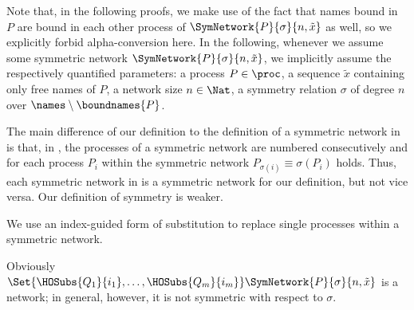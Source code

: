 \documentclass[11pt,techReport]{eptcs}
\begin{document}
\noindent
Note that, in the following proofs, we make use of the fact that names bound in $ P $ are bound in each other process of $ \SymNetwork{P}{\sigma}{n,\tilde{x}} $ as well, so we explicitly forbid alpha-conversion here. In the following, whenever we assume some symmetric network $\SymNetwork{P}{\sigma}{n,\tilde{x}}$, we implicitly assume the respectively quantified parameters: a process $P\in\proc$, a sequence $\tilde{x}$ containing only free names of $P$, a network size $n\in\Nat$, a symmetry relation $\sigma$ of degree $ n $ over $ \names \setminus \boundnames{P} $.

The main difference of our definition to the definition of a symmetric network in \cite{palamidessi03} is that, in \cite{palamidessi03}, the processes of a symmetric network are numbered consecutively and for each process $ P_i $ within the symmetric network $ P_{\sigma\left( i \right)} \equiv \sigma\left( P_i \right) $ holds.  Thus, each symmetric network in \cite{palamidessi03} is a symmetric network for our definition, but not vice versa. Our definition of symmetry is weaker.



We use an index-guided form of substitution to replace single processes within a symmetric network.

\noindent
Obviously $ \Set{ \HOSubs{Q_1}{i_1}, \ldots, \HOSubs{Q_m}{i_m} }\SymNetwork{P}{\sigma}{n, \tilde{x}} $ is a network; in general, however, it is not symmetric with respect to $ \sigma $.
\end{document}
